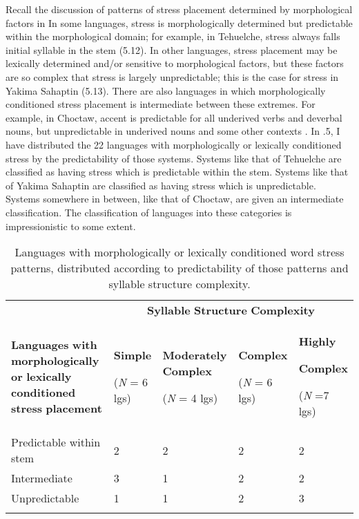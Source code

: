  Recall the discussion of patterns of stress placement determined by morphological factors in  In some languages, stress is morphologically determined but predictable within the morphological domain; for example, in Tehuelche, stress always falls initial syllable in the stem (5.12). In other languages, stress placement may be lexically determined and/or sensitive to morphological factors, but these factors are so complex that stress is largely unpredictable; this is the case for stress in Yakima Sahaptin (5.13). There are also languages in which morphologically conditioned stress placement is intermediate between these extremes. For example, in Choctaw, accent is predictable for all underived verbs and deverbal nouns, but unpredictable in underived nouns and some other contexts \citep{Broadwell2006}. In .5, I have distributed the 22 languages with morphologically or lexically conditioned stress by the predictability of those systems. Systems like that of Tehuelche are classified as having stress which is predictable within the stem. Systems like that of Yakima Sahaptin are classified as having stress which is unpredictable. Systems somewhere in between, like that of Choctaw, are given an intermediate classification. The classification of languages into these categories is impressionistic to some extent.

\begin{table}
\begin{tabularx}{\textwidth}{XXXXX}
\lsptoprule
 & \multicolumn{4}{c}{ \textbf{Syllable} \textbf{Structure} \textbf{Complexity}}\\
 \textbf{Languages} \textbf{with} \textbf{morphologically} \textbf{or} \textbf{lexically} \textbf{conditioned} \textbf{stress} \textbf{placement} & { \textbf{Simple}}

 (\textit{N} = 6 lgs) & { \textbf{Moderately} \textbf{Complex}}

 (\textit{N} = 4 lgs) & { \textbf{Complex}}

 (\textit{N} = 6 lgs) & { \textbf{Highly} }

{ \textbf{Complex}}

 (\textit{N} =7 lgs)\\
 Predictable within stem & 2 & 2 & 2 & 2\\
 Intermediate & 3 & 1 & 2 & 2\\
 Unpredictable & 1 & 1 & 2 & 3\\
\lspbottomrule
\end{tabularx}
\caption{\label{5.5}Languages with morphologically or lexically conditioned word stress patterns, distributed according to predictability of those patterns and syllable structure complexity.}
\end{table}

